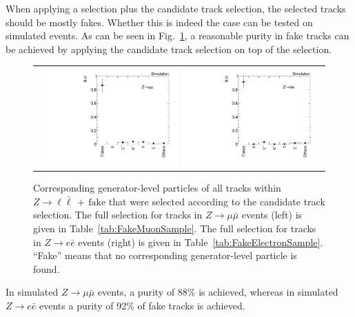 When applying a \Zlep selection plus the candidate track selection, the selected tracks should be mostly fakes.
Whether this is indeed the case can be tested on simulated \Zlep events.
As can be seen in Fig.~\ref{fig:BkgComposition}, a reasonable purity in fake tracks can be achieved by applying the candidate track selection on top of the \Zlep selection.
\begin{figure}[!tb]
  \centering 
  \begin{tabular}{c}
    \includegraphics[width=0.49\textwidth]{figures/analysis/Background/ParticleCompositionInFakeCS_Mu.pdf}
    \includegraphics[width=0.49\textwidth]{figures/analysis/Background/ParticleCompositionInFakeCS_Ele.pdf}
  \end{tabular}
  \caption{Corresponding generator-level particles of all tracks within $Z\rightarrow \ell \bar{\ell}\,+\,\text{fake}$ that were selected according to the candidate track selection. 
           The full selection for tracks in $Z\rightarrow \mu \bar{\mu}$ events (left) is given in Table~\ref{tab:FakeMuonSample}.
           The full selection for tracks in $Z\rightarrow e \bar{e}$ events (right) is given in Table~\ref{tab:FakeElectronSample}.
           ``Fake'' means that no corresponding generator-level particle is found. }
  \label{fig:BkgComposition}
\end{figure}
In simulated $Z\rightarrow\mu\bar{\mu}$ events, a purity of 88\% is achieved, whereas in simulated $Z\rightarrow e\bar{e}$ events a purity of 92\% of fake tracks is achieved.


